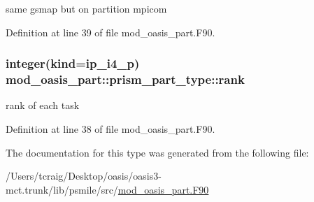 same gsmap but on partition mpicom 



Definition at line 39 of file mod\+\_\+oasis\+\_\+part.\+F90.

\hypertarget{structmod__oasis__part_1_1prism__part__type_a1bf56b7dcc55c07cab5d1be13d33cfdd}{
\subsubsection[{rank}]{\setlength{\rightskip}{0pt plus 5cm}integer(kind=ip\+\_\+i4\+\_\+p) mod\+\_\+oasis\+\_\+part\+::prism\+\_\+part\+\_\+type\+::rank\hspace{0.3cm}{\ttfamily [private]}}}\label{structmod__oasis__part_1_1prism__part__type_a1bf56b7dcc55c07cab5d1be13d33cfdd}


rank of each task 



Definition at line 38 of file mod\+\_\+oasis\+\_\+part.\+F90.



The documentation for this type was generated from the following file\+:\begin{DoxyCompactItemize}
\item 
/\+Users/tcraig/\+Desktop/oasis/oasis3-\/mct.\+trunk/lib/psmile/src/\hyperlink{mod__oasis__part_8_f90}{mod\+\_\+oasis\+\_\+part.\+F90}\end{DoxyCompactItemize}
